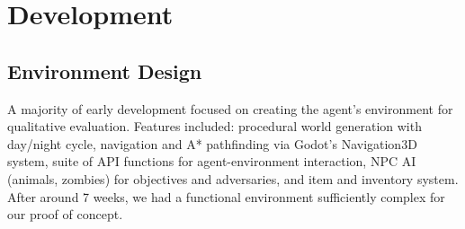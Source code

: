 \documentclass{article}
\begin{document}
\section{Development}
\subsection{Environment Design}
A majority of early development focused on creating the agent's environment for qualitative evaluation.
Features included: procedural world generation with day/night cycle, navigation and A* pathfinding via Godot's Navigation3D system, suite of API functions for agent-environment interaction, NPC AI (animals, zombies) for objectives and adversaries, and item and inventory system.
After around 7 weeks, we had a functional environment sufficiently complex for our proof of concept.
\end{document}
